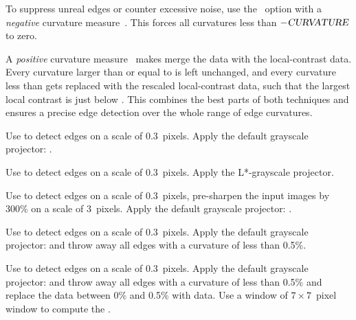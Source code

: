 To suppress unreal edges or counter excessive noise, use the
~option with a \emph{negative} curvature
measure~.  This forces all curvatures less than $-\textsl{CURVATURE}$ to
zero.

A \emph{positive} curvature measure~ makes \App{} merge the 
data with the local-contrast data.  Every curvature larger than or equal to 
is left unchanged, and every curvature less than  gets replaced with the
rescaled local-contrast data, such that the largest local contrast is just below
.  This combines the best parts of both techniques and ensures a precise edge
detection over the whole range of edge curvatures.

\noindent{}

\begin{codelist}
\item[\option{--contrast-edge-scale=0.3}]\itemend
  Use  to detect edges on a scale of 0.3~pixels.  Apply the default grayscale
  projector: .

\item[\itempar{\option{--contrast-edge-scale=0.3} \option{--gray-projector=l-star}}]\itemend
  Use  to detect edges on a scale of 0.3~pixels.  Apply the L*-grayscale projector.

\item[\option{--contrast-edge-scale=0.3:3:300\%}]\itemend
  Use  to detect edges on a scale of 0.3~pixels, pre-sharpen the input images by
  300\% on a scale of 3~pixels.  Apply the default grayscale projector: .

\item[\itempar{\option{--contrast-edge-scale=0.3}
    \mbox{\option{--contrast-min-curvature=-0.5\%}}}]\itemend
  Use  to detect edges on a scale of 0.3~pixels.  Apply the default grayscale
  projector:  and throw away all edges with a curvature of less than 0.5\%.

\item[\itempar{\mbox{\option{--contrast-edge-scale=0.3}}
    \mbox{\option{--contrast-min-curvature=0.5\%}}
    \mbox{\option{--contrast-window-size=7}}}]\itemend
  Use  to detect edges on a scale of 0.3~pixels.  Apply the default grayscale
  projector:  and throw away all edges with a curvature of less than 0.5\% and
  replace the  data between 0\% and 0.5\% with  data.  Use a window
  of $7 \times 7$~pixel window to compute the .
\end{codelist}


